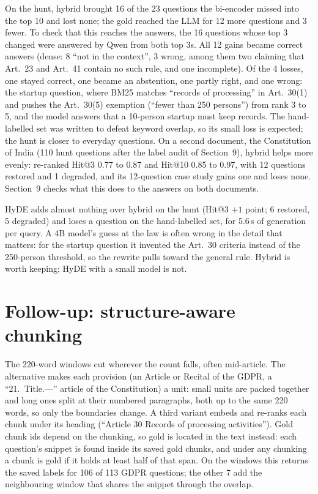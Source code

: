 \documentclass[10pt,a4paper]{article}
\begin{document}
On the hunt, hybrid brought 16 of the 23 questions the bi-encoder missed into the top 10 and lost none; the gold
reached the LLM for 12 more questions and 3 fewer. To check that this reaches the answers, the 16 questions whose
top 3 changed were answered by Qwen from both top 3s. All 12 gains became correct answers (dense: 8 ``not in the
context'', 3 wrong, among them two claiming that Art.~23 and Art.~41 contain no such rule, and one incomplete). Of the 4 losses, one stayed correct, one became an abstention, one partly
right, and one wrong: the startup question, where BM25 matches ``records of processing'' in Art.~30(1) and pushes
the Art.~30(5) exemption (``fewer than 250 persons'') from rank 3 to 5, and the model answers that a 10-person
startup must keep records. The hand-labelled set was written to defeat keyword overlap, so its small loss is
expected; the hunt is closer to everyday questions. On a second document, the Constitution of India (110 hunt
questions after the label audit of Section~9), hybrid helps more evenly: re-ranked Hit@3 0.77 to 0.87 and Hit@10
0.85 to 0.97, with 12 questions restored and 1 degraded, and its 12-question case study gains one and loses none.
Section~9 checks what this does to the answers on both documents.

HyDE adds almost nothing over hybrid on the hunt (Hit@3 $+1$ point; 6 restored, 5 degraded) and loses a question on
the hand-labelled set, for 5.6\,s of generation per query. A 4B model's guess at the law is often wrong in the
detail that matters: for the startup question it invented the Art.~30 criteria instead of the 250-person
threshold, so the rewrite pulls toward the general rule. Hybrid is worth keeping; HyDE with a small model is not.

\section{Follow-up: structure-aware chunking}

The 220-word windows cut wherever the count falls, often mid-article. The alternative makes each provision
(an Article or Recital of the GDPR, a ``21.~Title.---'' article of the Constitution) a unit: small units are
packed together and long ones split at their numbered paragraphs, both up to the same 220 words, so only the
boundaries change. A third variant embeds and re-ranks each chunk under its heading (``Article 30 Records of
processing activities''). Gold chunk ids depend on the chunking, so gold is located in the text instead: each
question's snippet is found inside its saved gold chunks, and under any chunking a chunk is gold if it holds at
least half of that span. On the windows this returns the saved labels for 106 of 113 GDPR questions; the other
7 add the neighbouring window that shares the snippet through the overlap.
\end{document}
